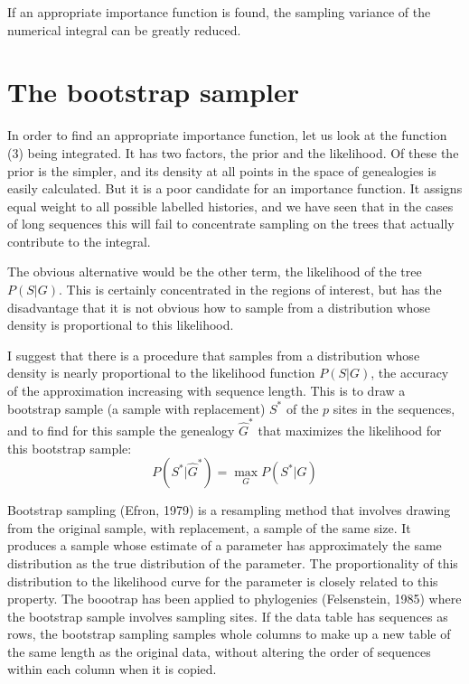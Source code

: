 If an appropriate importance function is found, the sampling variance of the
numerical integral can be greatly reduced.

\bigskip

\section{The bootstrap sampler}

In order to find an appropriate importance function, let us look at the
function (3) being integrated.  It has two factors, the prior and the
likelihood.  Of these the prior is the simpler, and its density at all
points in the space of genealogies is easily calculated.  But it is a
poor candidate for an importance function.  It assigns equal weight to all
possible labelled histories, and we have seen that in the cases of long
sequences
this will fail to concentrate sampling on the trees that actually contribute
to the integral.

The obvious alternative would be the other term, the likelihood of the
tree $P(S | G)$.  This is certainly concentrated in the regions of interest,
but has the disadvantage that it is not obvious how to sample from a
distribution whose density is proportional to this likelihood.

I suggest that there is a procedure that samples from a distribution whose
density is nearly proportional to the likelihood function $P(S | G)$, the
accuracy of the approximation increasing with sequence length.  This is to
draw a bootstrap sample (a sample with replacement) $S^*$ of the $p$ sites in
the sequences, and to find for
this sample the genealogy ${\hat G}^*$ that maximizes the likelihood for this
bootstrap sample:
\begin{equation} %
     P( S^* | {\hat G}^*)  =  \max_{G} P(S^* | G)
\end{equation}

Bootstrap sampling (Efron, 1979) is a resampling method that involves drawing
from the original sample, with replacement, a sample of the same size.
It produces a sample whose estimate of a parameter has approximately the
same distribution as the true distribution of the parameter.  The
proportionality of this distribution to the likelihood curve for the
parameter is closely related to this property.  The boootrap
has been applied to phylogenies (Felsenstein, 1985) where the
bootstrap sample involves sampling sites.  If the data table has sequences
as rows, the bootstrap sampling samples whole columns to make up a new table of
the same length as the original data, without altering the order of sequences
within each column when it is copied.

